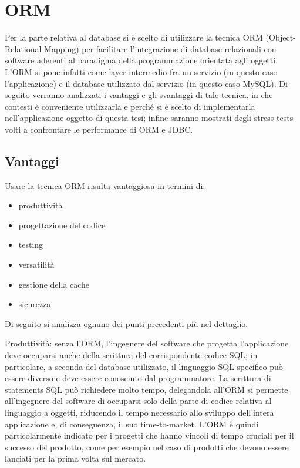 \chapter{ORM}

Per la parte relativa al database si è scelto di utilizzare la tecnica ORM (Object-Relational Mapping) per facilitare l'integrazione di database relazionali con software aderenti al paradigma della programmazione orientata agli oggetti. L'ORM si pone infatti come layer intermedio fra un servizio (in questo caso l'applicazione) e il database utilizzato dal servizio (in questo caso MySQL). Di seguito verranno analizzati i vantaggi e gli svantaggi di tale tecnica, in che contesti è conveniente utilizzarla e perché si è scelto di implementarla nell'applicazione oggetto di questa tesi; infine saranno mostrati degli stress tests volti a confrontare le performance di ORM e JDBC.

\section{Vantaggi}

Usare la tecnica ORM risulta vantaggiosa in termini di:

\begin{itemize}
  \item produttività
  \item progettazione del codice
  \item testing
  \item versatilità
  \item gestione della cache 
  \item sicurezza
\end{itemize}

Di seguito si analizza ognuno dei punti precedenti più nel dettaglio.

Produttività: senza l'ORM, l'ingegnere del software che progetta l'applicazione deve occuparsi anche della scrittura del corrispondente codice SQL; in particolare, a seconda del database utilizzato, il linguaggio SQL specifico può essere diverso e deve essere conosciuto dal programmatore. La scrittura di statements SQL può richiedere molto tempo, delegandola all'ORM si permette all'ingegnere del software di occuparsi solo della parte di codice relativa al linguaggio a oggetti, riducendo il tempo necessario allo sviluppo dell'intera applicazione e, di conseguenza, il suo time-to-market. L'ORM è quindi particolarmente indicato per i progetti che hanno vincoli di tempo cruciali per il successo del prodotto, come per esempio nel caso di prodotti che devono essere lanciati per la prima volta sul mercato.

